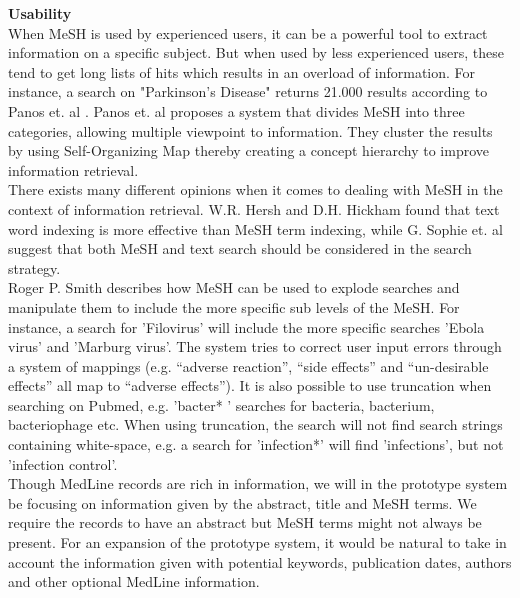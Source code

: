 \textbf{Usability} \\ When MeSH is used by experienced users, it can
be a powerful tool to extract information on a specific subject. But
when used by less experienced users, these tend to get long lists of
hits which results in an overload of information. For instance, a
search on "Parkinson's Disease" returns 21.000 results according to
Panos et. al \cite{DataMiningBiomedicine}. Panos et. al
\cite{DataMiningBiomedicine} proposes a system that divides MeSH into
three categories, allowing multiple viewpoint to information. They
cluster the results by using Self-Organizing Map thereby creating a
concept hierarchy to improve information retrieval.\\

There exists many different opinions when it comes to dealing with
MeSH in the context of information retrieval. W.R. Hersh and
D.H. Hickham \cite{RetrievalEffectiveness} found that text word
indexing is more effective than MeSH term indexing, while G. Sophie
et. al \cite{FDGPET} suggest that both MeSH and text search should be
considered in the search strategy.\\

Roger P. Smith \cite{TheInternetforPhysicians} describes how MeSH can be used to
explode searches and manipulate them to include the more specific sub
levels of the MeSH. For instance, a search for 'Filovirus' will
include the more specific searches 'Ebola virus' and 'Marburg
virus'. The system tries to correct user input errors through a system
of mappings (e.g. ``adverse reaction'', ``side effects'' and
``un-desirable effects'' all map to ``adverse effects''). It is also
possible to use truncation when searching on Pubmed, e.g. 'bacter* '
searches for bacteria, bacterium, bacteriophage etc. When using
truncation, the search will not find search strings containing
white-space, e.g. a search for 'infection*' will find 'infections',
but not 'infection control'.\\

Though MedLine records are rich in information, we will in the
prototype system be focusing on information given by the abstract,
title and MeSH terms. We require the records to have an abstract but
MeSH terms might not always be present. For an expansion of the
prototype system, it would be natural to take in account the
information given with potential keywords, publication dates, authors
and other optional MedLine information. 

